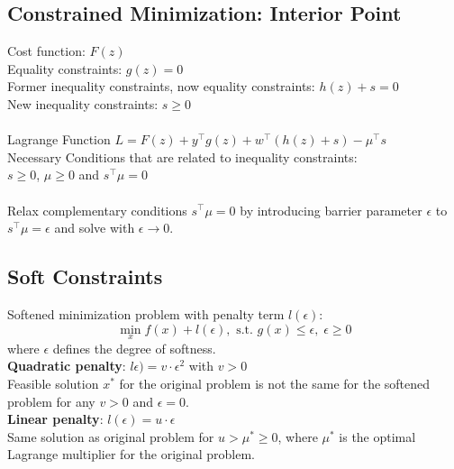 \documentclass[english]{latex4ei/latex4ei_sheet}
\begin{document}
\begin{sectionbox}
\subsection{Constrained Minimization: Interior Point}
Cost function: $F(z)$\\
Equality constraints: $g(z)=0$\\
Former inequality constraints, now equality constraints: $h(z)+s=0$\\
New inequality constraints: $s\geq 0$\\
\\
Lagrange Function $L=F(z)+y^{\top}g(z)+w^{\top}(h(z)+s)-\mu^{\top}s$\\
Necessary Conditions that are related to inequality constraints:\\
$s \geq 0 $, $\mu \geq 0$ and $s^{\top}\mu=0$\\
\\
Relax complementary conditions $s^{\top}\mu=0$ by introducing barrier parameter $\epsilon$ to $s^{\top}\mu=\epsilon$ and solve with $\epsilon \rightarrow 0$.\\

\subsection{Soft Constraints}
Softened minimization problem with penalty term $l(\epsilon)$:
$$\min_{x}f(x)+l(\epsilon), \text{ s.t. }g(x)\leq\epsilon,\;\epsilon \geq 0$$
where $\epsilon$ defines the degree of softness.
\vspace{0.1cm}\\
\textbf{Quadratic penalty}: $l\epsilon)=v\cdot\epsilon^{2}$ with $v>0$\\
Feasible solution $x^*$ for the original problem is not the same for the softened problem for any $v>0$ and $\epsilon=0$.
\vspace{0.1cm}\\
\textbf{Linear penalty}: $l(\epsilon)=u\cdot\epsilon$\\
Same solution as original problem for $u>\mu^*\geq 0$, where $\mu^*$ is the optimal Lagrange multiplier for the original problem.
\end{sectionbox}
\end{document}
